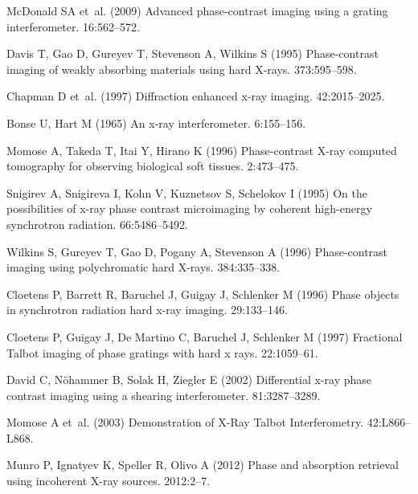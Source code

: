 \documentclass{pnastwo}
\begin{document}
\begin{article}
\begin{thebibliography}{10}
McDonald SA et~al. (2009) {Advanced phase-contrast imaging using a grating
  interferometer}.
 16:562--572.

Davis T, Gao D, Gureyev T, Stevenson A, Wilkins S (1995) {Phase-contrast
  imaging of weakly absorbing materials using hard X-rays}.
 373:595--598.

Chapman D et~al. (1997) {Diffraction enhanced x-ray imaging}.
 42:2015--2025.

Bonse U, Hart M (1965) {An x-ray interferometer}.
 6:155--156.

Momose A, Takeda T, Itai Y, Hirano K (1996) {Phase-contrast X-ray computed
  tomography for observing biological soft tissues}.
 2:473--475.

Snigirev A, Snigireva I, Kohn V, Kuznetsov S, Schelokov I (1995) {On the
  possibilities of x-ray phase contrast microimaging by coherent high-energy
  synchrotron radiation}.
 66:5486--5492.

Wilkins S, Gureyev T, Gao D, Pogany A, Stevenson A (1996) {Phase-contrast
  imaging using polychromatic hard X-rays}.
 384:335--338.

Cloetens P, Barrett R, Baruchel J, Guigay J, Schlenker M (1996) {Phase objects
  in synchrotron radiation hard x-ray imaging}.
 29:133--146.

Cloetens P, Guigay J, {De Martino} C, Baruchel J, Schlenker M (1997)
  {Fractional Talbot imaging of phase gratings with hard x rays.}
 22:1059--61.

David C, N\"{o}hammer B, Solak H, Ziegler E (2002) {Differential x-ray phase
  contrast imaging using a shearing interferometer}.
 81:3287--3289.

Momose A et~al. (2003) {Demonstration of X-Ray Talbot Interferometry}.
 42:L866--L868.

Munro P, Ignatyev K, Speller R, Olivo A (2012) {Phase and absorption retrieval
  using incoherent X-ray sources}.
 2012:2--7.


\end{thebibliography}
\end{article}
\end{document}
